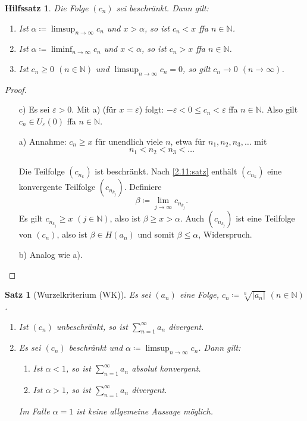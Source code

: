 \documentclass[12pt]{extreport} %
\newcommand{\N}{\mathbb{N}}
\theoremstyle{named}
\theoremstyle{itshape}
\newtheorem{satz}[unnamedtheorem]{Satz}
\newtheorem{hilfssatz}[unnamedtheorem]{Hilfssatz}
\theoremstyle{normal}
\begin{document}
\begin{hilfssatz} \label{HS3}
Die Folge $(c_{n})$ sei beschränkt. Dann gilt:
	\begin{enumerate}
		\item Ist $\alpha \coloneqq \limsup_{n \to \infty} c_{n}$ und $x > \alpha$, so ist $c_{n} < x$ ffa $n \in \N$.
				
		\item Ist $\alpha \coloneqq \liminf_{n \to \infty}  c_{n}$ und $x < \alpha$, so ist $c_{n} > x$ ffa $n \in \N$.
		\item Ist $c_{n} \geq 0$ $(n \in \N)$ und $\limsup_{n \to \infty}  c_{n} = 0$, so gilt $c_{n} \rightarrow 0$ $(n \to \infty)$.
	\end{enumerate}
\end{hilfssatz}

\begin{proof} ~\
	\begin{enumerate}
		\item[c)] Es sei $\varepsilon > 0$. Mit a) (für $x=\varepsilon$) folgt: $-\varepsilon < 0 \leq c_{n} < \varepsilon$ ffa $n \in \N$. Also gilt 
		 $c_{n} \in U_{\varepsilon}(0)$ ffa $n \in \N$.
		\item[a)] Annahme: $c_{n} \geq x$ für unendlich viele $n$, etwa für $n_{1}, n_{2}, n_{3}, \dotsc$ mit $$n_{1} < n_{2} < n_{3} < \dotsc$$ \\
		 Die Teilfolge $(c_{n_{k}})$ ist beschränkt. Nach \ref{2.11:satz} enthält $(c_{n_{k}})$ eine konvergente Teilfolge $(c_{n_{k_{j}}})$. Definiere
		 $$ \beta \coloneqq \lim_{j\rightarrow \infty} c_{n_{k_{j}}}. $$
		 Es gilt $c_{n_{k_{j}}} \geq x$ $(j \in \N)$, also ist $\beta \geq x > \alpha$. Auch $(c_{n_{k_{j}}})$ ist eine Teilfolge von $(c_{n})$, also ist 
		 $\beta \in H(a_{n})$ und somit $\beta \leq \alpha$, Widerspruch.
		 \item[b)] Analog wie a).
	\end{enumerate}	
\end{proof}

\begin{satz}[Wurzelkriterium (WK)] \label{3.6:prop-Wurzelkriterium}
	Es sei $(a_{n})$ eine Folge, $c_{n} \coloneqq \sqrt[n]{|a_{n}|}$ $(n \in \N)$.
	\begin{enumerate}
		\item Ist $(c_{n})$ unbeschränkt, so ist $\sum_{n=1}^{\infty} a_{n}$ divergent.
		\item Es sei $(c_{n})$ beschränkt und $\alpha \coloneqq \limsup_{n \rightarrow \infty} c_{n}$. Dann gilt:
			\begin{enumerate}
				\item Ist $\alpha < 1$, so ist $\sum_{n=1}^{\infty} a_{n}$ absolut konvergent.
				\item Ist $\alpha > 1$, so ist $\sum_{n=1}^{\infty} a_{n}$ divergent.
			\end{enumerate}
			Im Falle $\alpha = 1$ ist keine allgemeine Aussage möglich.
	\end{enumerate}
\end{satz}
\end{document}
